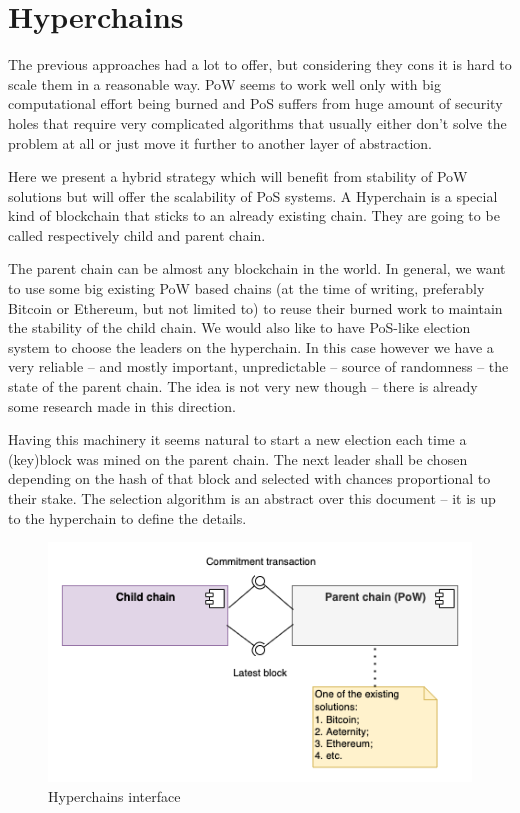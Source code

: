 \section{Hyperchains}
\graphicspath{ {./images/} }

The previous approaches had a lot to offer, but considering they cons it is hard
to scale them in a reasonable way. PoW seems to work well only with big
computational effort being burned and PoS suffers from huge amount of security
holes that require very complicated algorithms that usually either don't solve
the problem at all or just move it further to another layer of abstraction.

Here we present a hybrid strategy which will benefit from stability of PoW
solutions but will offer the scalability of PoS systems. A Hyperchain is a
special kind of blockchain that sticks to an already existing chain. They are
going to be called respectively child and parent chain\cite{hyperchains}.

The parent chain can be almost any blockchain in the world. In general, we want
to use some big existing PoW based chains (at the time of writing, preferably
Bitcoin or Ethereum, but not limited to) to reuse their burned work to maintain
the stability of the child chain. We would also like to have
PoS-like election system to choose the leaders on the hyperchain. In this case
however we have a very reliable – and mostly important, unpredictable – source
of randomness – the state of the parent chain. The idea is not very new
though – there is already some research made in this direction\cite{blockchain_random}.

Having this machinery it seems natural to start a new election each time a
(key)block was mined on the parent chain. The next leader shall be chosen
depending on the hash of that block and selected with chances proportional to
their stake. The selection algorithm is an abstract over this document – it is
up to the hyperchain to define the details.

\begin{figure}[b]
	\caption{Hyperchains interface}
	\centering
	\includegraphics[scale=0.5]{hyperchains_interface}
\end{figure}


